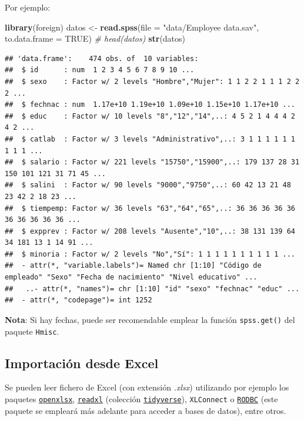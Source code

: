 \documentclass[
]{book}
\newenvironment{Shaded}{\begin{snugshade}}{\end{snugshade}}
\newcommand{\CommentTok}[1]{\textcolor[rgb]{0.56,0.35,0.01}{\textit{#1}}}
\newcommand{\DataTypeTok}[1]{\textcolor[rgb]{0.13,0.29,0.53}{#1}}
\newcommand{\KeywordTok}[1]{\textcolor[rgb]{0.13,0.29,0.53}{\textbf{#1}}}
\newcommand{\NormalTok}[1]{#1}
\newcommand{\OtherTok}[1]{\textcolor[rgb]{0.56,0.35,0.01}{#1}}
\newcommand{\StringTok}[1]{\textcolor[rgb]{0.31,0.60,0.02}{#1}}
\begin{document}
Por ejemplo:

\begin{Shaded}
\begin{Highlighting}[]
\KeywordTok{library}\NormalTok{(foreign)}
\NormalTok{datos <-}\StringTok{ }\KeywordTok{read.spss}\NormalTok{(}\DataTypeTok{file =} \StringTok{"data/Employee data.sav"}\NormalTok{, }\DataTypeTok{to.data.frame =} \OtherTok{TRUE}\NormalTok{)}
\CommentTok{# head(datos)}
\KeywordTok{str}\NormalTok{(datos)}
\end{Highlighting}
\end{Shaded}

\begin{verbatim}
## 'data.frame':    474 obs. of  10 variables:
##  $ id      : num  1 2 3 4 5 6 7 8 9 10 ...
##  $ sexo    : Factor w/ 2 levels "Hombre","Mujer": 1 1 2 2 1 1 1 2 2 2 ...
##  $ fechnac : num  1.17e+10 1.19e+10 1.09e+10 1.15e+10 1.17e+10 ...
##  $ educ    : Factor w/ 10 levels "8","12","14",..: 4 5 2 1 4 4 4 2 4 2 ...
##  $ catlab  : Factor w/ 3 levels "Administrativo",..: 3 1 1 1 1 1 1 1 1 1 ...
##  $ salario : Factor w/ 221 levels "15750","15900",..: 179 137 28 31 150 101 121 31 71 45 ...
##  $ salini  : Factor w/ 90 levels "9000","9750",..: 60 42 13 21 48 23 42 2 18 23 ...
##  $ tiempemp: Factor w/ 36 levels "63","64","65",..: 36 36 36 36 36 36 36 36 36 36 ...
##  $ expprev : Factor w/ 208 levels "Ausente","10",..: 38 131 139 64 34 181 13 1 14 91 ...
##  $ minoria : Factor w/ 2 levels "No","Sí": 1 1 1 1 1 1 1 1 1 1 ...
##  - attr(*, "variable.labels")= Named chr [1:10] "Código de empleado" "Sexo" "Fecha de nacimiento" "Nivel educativo" ...
##   ..- attr(*, "names")= chr [1:10] "id" "sexo" "fechnac" "educ" ...
##  - attr(*, "codepage")= int 1252
\end{verbatim}

\textbf{Nota}: Si hay fechas, puede ser recomendable emplear la función \texttt{spss.get()} del paquete \texttt{Hmisc}.

\hypertarget{importaciuxf3n-desde-excel}{%
\subsection{Importación desde Excel}\label{importaciuxf3n-desde-excel}}

Se pueden leer fichero de
Excel (con extensión \emph{.xlsx}) utilizando por ejemplo los paquetes \href{https://cran.r-project.org/web/packages/openxlsx/index.html}{\texttt{openxlsx}}, \href{https://readxl.tidyverse.org}{\texttt{readxl}} (colección \href{https://www.tidyverse.org/}{\texttt{tidyverse}}), \texttt{XLConnect} o
\href{https://cran.r-project.org/web/packages/RODBC/index.html}{\texttt{RODBC}} (este paquete se empleará más adelante para acceder a bases de datos),
entre otros.
\end{document}
